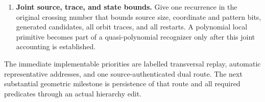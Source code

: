 \begin{enumerate}[leftmargin=*,label=\textbf{\arabic*.}]
\item \textbf{Joint source, trace, and state bounds.}
Give one recurrence in the original crossing number that bounds
source size, coordinate and pattern bits, generated candidates,
all orbit traces, and all restarts. A polynomial local primitive
becomes part of a quasi-polynomial recognizer only after this joint
accounting is established.
\end{enumerate}

The immediate implementable priorities are labelled transversal replay,
automatic representative addresses, and one source-authenticated dual
route. The next substantial geometric milestone is persistence of that
route and all required predicates through an actual hierarchy edit.
